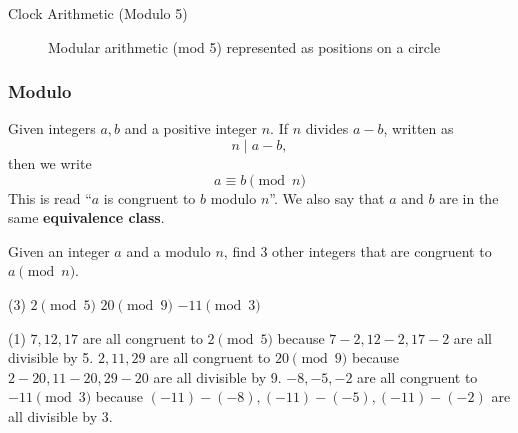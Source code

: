 \begin{frame}{Clock Arithmetic (Modulo 5)}
\begin{figure}[h!]
\centering
{}
\caption{Modular arithmetic (mod 5) represented as positions on a circle}
\end{figure}
\end{frame}

\begin{frame}
\frametitle{Modulo}
\begin{defn}{}{}
Given integers $a,b$ and a positive integer $n$. If $n$ divides $a-b$, written as
\[ n \mid a-b, \]
then we write
\begin{equation} 
a \equiv b \pmod n
\end{equation}
This is read ``$a$ is congruent to $b$ modulo $n$''. We also say that $a$ and $b$ are in the same \textbf{equivalence class}.
\end{defn}
\end{frame}


\begin{frame}[t]
\begin{ex}
Given an integer $a$ and a modulo $n$, find 3 other integers that are congruent to $a \pmod n$.
\begin{tasks}(3)
\task $2 \pmod 5$
\task $20 \pmod 9$
\task $-11 \pmod 3$
\end{tasks}
\end{ex}
\begin{sol}
\begin{tasks}(1)
\task $7,12,17$ are all congruent to $2 \pmod 5$ because $7-2, 12-2, 17-2$ are all divisible by 5.
\task $2, 11, 29$ are all congruent to $20 \pmod 9$ because $2-20, 11-20, 29-20$ are all divisible by 9.
\task $-8, -5, -2$ are all congruent to $-11 \pmod 3$ because $(-11)-(-8), (-11)-(-5), (-11)-(-2)$ are all divisible by 3.
\end{tasks}
\end{sol}
\end{frame}

